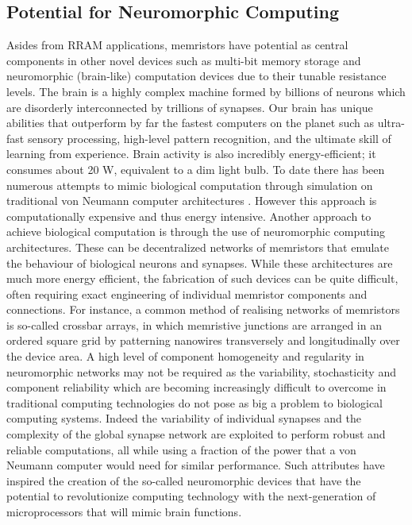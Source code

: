 \subsection{Potential for Neuromorphic Computing}
Asides from RRAM applications, memristors have potential as central components in other novel devices such as multi-bit memory storage\cite{valov2013,russo2009} and neuromorphic (brain-like) computation devices\cite{ziegler2012,riggert2014,calimera2013,ye2014mem,gkoupidenis2017,kumar2017,yu2013,indiveri2013} due to their tunable resistance levels. The brain is a highly complex machine formed by billions of neurons which are disorderly interconnected by trillions of synapses\cite{jo2010,yu2013}. Our brain has unique abilities that outperform by far the fastest computers on the planet such as ultra-fast sensory processing, high-level pattern recognition, and the ultimate skill of learning from experience. Brain activity is also incredibly energy-efficient; it consumes about 20 W, equivalent to a dim light bulb\cite{sengupta2014}. To date there has been numerous attempts to mimic biological computation through simulation on traditional von Neumann computer architectures \cite{indiveri2013}. However this approach is computationally expensive and thus energy intensive. Another approach to achieve biological computation is through the use of neuromorphic computing architectures\cite{zahari2015,prezioso2015,yang2013}. These can be decentralized networks of memristors that emulate the behaviour of biological neurons and synapses\cite{jeong2013}. While these architectures are much more energy efficient, the fabrication of such devices can be quite difficult, often requiring exact engineering of individual memristor components and connections. For instance, a common method of realising networks of memristors is so-called crossbar arrays\cite{hu2012,prezioso2015,xia2009,joshua2012,borghetti2009}, in which memristive junctions are arranged in an ordered square grid by patterning nanowires transversely and longitudinally over the device area. A high level of component homogeneity and regularity in neuromorphic networks may not be required as the variability, stochasticity and component reliability which are becoming increasingly difficult to overcome in traditional computing technologies do not pose as big a problem to biological computing systems\cite{querlioz2013}. Indeed the variability of individual synapses and the complexity of the global synapse network are exploited to perform robust and reliable computations, all while using a fraction of the power that a von Neumann computer would need for similar performance. Such attributes have inspired the creation of the so-called neuromorphic devices that have the potential to revolutionize computing technology with the next-generation of microprocessors that will mimic brain functions\cite{calimera2013,ye2014mem,gkoupidenis2017,kumar2017,yu2013}.

